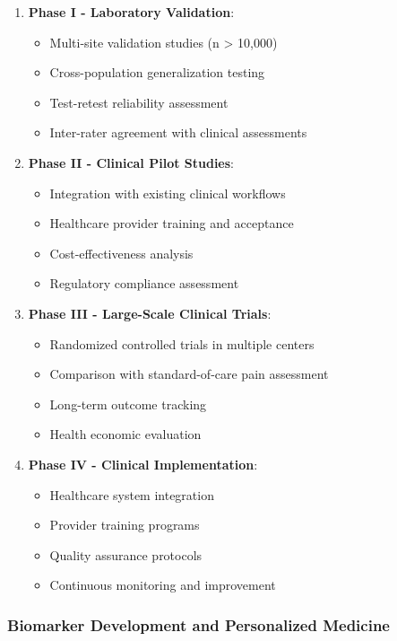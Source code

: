 \documentclass[10pt,journal,compsoc]{IEEEtran}
\begin{document}
\begin{enumerate}
\item \textbf{Phase I - Laboratory Validation}:
   \begin{itemize}
   \item Multi-site validation studies (n > 10,000)
   \item Cross-population generalization testing
   \item Test-retest reliability assessment
   \item Inter-rater agreement with clinical assessments
   \end{itemize}

\item \textbf{Phase II - Clinical Pilot Studies}:
   \begin{itemize}
   \item Integration with existing clinical workflows
   \item Healthcare provider training and acceptance
   \item Cost-effectiveness analysis
   \item Regulatory compliance assessment
   \end{itemize}

\item \textbf{Phase III - Large-Scale Clinical Trials}:
   \begin{itemize}
   \item Randomized controlled trials in multiple centers
   \item Comparison with standard-of-care pain assessment
   \item Long-term outcome tracking
   \item Health economic evaluation
   \end{itemize}

\item \textbf{Phase IV - Clinical Implementation}:
   \begin{itemize}
   \item Healthcare system integration
   \item Provider training programs
   \item Quality assurance protocols
   \item Continuous monitoring and improvement
   \end{itemize}
\end{enumerate}

\subsubsection{Biomarker Development and Personalized Medicine}
\end{document}
